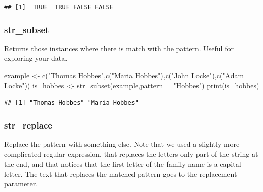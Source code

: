 \documentclass[
]{book}
\newenvironment{Shaded}{\begin{snugshade}}{\end{snugshade}}
\newcommand{\AttributeTok}[1]{\textcolor[rgb]{0.77,0.63,0.00}{#1}}
\newcommand{\FunctionTok}[1]{\textcolor[rgb]{0.00,0.00,0.00}{#1}}
\newcommand{\NormalTok}[1]{#1}
\newcommand{\OtherTok}[1]{\textcolor[rgb]{0.56,0.35,0.01}{#1}}
\newcommand{\SpecialCharTok}[1]{\textcolor[rgb]{0.00,0.00,0.00}{#1}}
\newcommand{\StringTok}[1]{\textcolor[rgb]{0.31,0.60,0.02}{#1}}
\begin{document}
\begin{verbatim}
## [1]  TRUE  TRUE FALSE FALSE
\end{verbatim}

\hypertarget{str_subset}{%
\subsubsection{str\_subset}\label{str_subset}}

Returns those instances where there is match with the pattern. Useful for exploring your data.

\begin{Shaded}
\begin{Highlighting}[]
\NormalTok{example }\OtherTok{\textless{}{-}} \FunctionTok{c}\NormalTok{(}\StringTok{"Thomas Hobbes"}\NormalTok{,}\FunctionTok{c}\NormalTok{(}\StringTok{"Maria Hobbes"}\NormalTok{),}\FunctionTok{c}\NormalTok{(}\StringTok{"John Locke"}\NormalTok{),}\FunctionTok{c}\NormalTok{(}\StringTok{"Adam Locke"}\NormalTok{))}
\NormalTok{is\_hobbes }\OtherTok{\textless{}{-}} \FunctionTok{str\_subset}\NormalTok{(example,}\AttributeTok{pattern =} \StringTok{"Hobbes"}\NormalTok{)}
\FunctionTok{print}\NormalTok{(is\_hobbes)}
\end{Highlighting}
\end{Shaded}

\begin{verbatim}
## [1] "Thomas Hobbes" "Maria Hobbes"
\end{verbatim}

\hypertarget{str_replace}{%
\subsubsection{str\_replace}\label{str_replace}}

Replace the pattern with something else. Note that we used a slightly more complicated regular expression, that
replaces the letters only part of the string at the end, and that notices that the first letter of the family name is a capital
letter. The text that replaces the matched pattern goes to the replacement parameter.

\begin{Shaded}
\end{Shaded}
\end{document}
